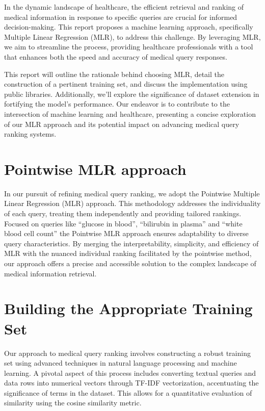 \documentclass[12pt]{article}
\begin{document}
In the dynamic landscape of healthcare, the efficient retrieval and ranking of medical information in response to specific queries are crucial for informed decision-making. This report proposes a machine learning approach, specifically Multiple Linear Regression (MLR), to address this challenge. By leveraging MLR, we aim to streamline the process, providing healthcare professionals with a tool that enhances both the speed and accuracy of medical query responses.

This report will outline the rationale behind choosing MLR, detail the construction of a pertinent training set, and discuss the implementation using public libraries. Additionally, we'll explore the significance of dataset extension in fortifying the model's performance. Our endeavor is to contribute to the intersection of machine learning and healthcare, presenting a concise exploration of our MLR approach and its potential impact on advancing medical query ranking systems.

\section{Pointwise MLR approach}

In our pursuit of refining medical query ranking, we adopt the Pointwise Multiple Linear Regression (MLR) approach. This methodology addresses the individuality of each query, treating them independently and providing tailored rankings. Focused on queries like ``glucose in blood'', ``bilirubin in plasma'' and ``white blood cell count'' the Pointwise MLR approach ensures adaptability to diverse query characteristics. By merging the interpretability, simplicity, and efficiency of MLR with the nuanced individual ranking facilitated by the pointwise method, our approach offers a precise and accessible solution to the complex landscape of medical information retrieval.

\section{Building the Appropriate Training Set}

Our approach to medical query ranking involves constructing a robust training set using advanced techniques in natural language processing and machine learning. A pivotal aspect of this process includes converting textual queries and data rows into numerical vectors through TF-IDF vectorization, accentuating the significance of terms in the dataset. This allows for a quantitative evaluation of similarity using the cosine similarity metric.
\end{document}
